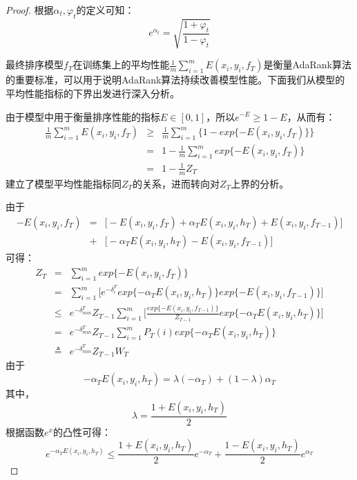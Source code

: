\begin{proof}
根据$\alpha_t,\varphi_t$的定义可知：
\begin{equation}
    e^{\alpha_t} = \sqrt{\frac{1+\varphi_t}{1-\varphi_t}}
\end{equation}

最终排序模型$f_T$在训练集上的平均性能$\frac{1}{m} \sum\limits_{i=1}^m E(x_i, y_i, f_T)$是衡量AdaRank算法的重要标准，可以用于说明AdaRank算法持续改善模型性能。下面我们从模型的平均性能指标的下界出发进行深入分析。

由于模型中用于衡量排序性能的指标$E\in [0,1]$，所以$e^{-E} \ge 1-E$，从而有：
\begin{equation}
    \begin{array}{lll}
      \frac{1}{m} \sum\limits_{i=1}^m E(x_i, y_i, f_T) & \ge & \frac{1}{m} \sum\limits_{i=1}^m \bigg\{ 1 - exp\{-E(x_i, y_i, f_T)\} \bigg\} \\
       & = & 1 - \frac{1}{m} \sum\limits_{i=1}^m exp\{-E(x_i, y_i, f_T)\} \\
       & = & 1 - \frac{1}{m} Z_T
    \end{array}
\end{equation}
建立了模型平均性能指标同$Z_T$的关系，进而转向对$Z_T$上界的分析。

由于
\[
    \begin{array}{lll}
      -E(x_i, y_i, f_T) & = & \big[-E(x_i, y_i, f_T) + \alpha_T E(x_i, y_i, h_T) + E(x_i, y_i, f_{T-1})\big] \\
       & + & \big[-\alpha_T E(x_i, y_i, h_T) - E(x_i, y_i, f_{T-1}) \big]
    \end{array}
\]
可得：
\begin{equation}
    \begin{array}{lll}
      Z_T & = & \sum\limits_{i=1}^m exp\{-E(x_i, y_i, f_T)\} \\
       & = & \sum\limits_{i=1}^m \bigg[e^{-\delta_i^T} exp\{-\alpha_T E(x_i, y_i, h_T)\} exp\{-E(x_i, y_i, f_{T-1})\}\bigg] \\
       & \le & e^{-\delta_{min}^T} Z_{T-1} \sum\limits_{i=1}^m \bigg[\frac{exp\{-E(x_i, y_i, f_{T-1})\}}{Z_{T-1}} exp\{-\alpha_T E(x_i, y_i, h_T)\}\bigg] \\
       & = & e^{-\delta_{min}^T} Z_{T-1} \sum\limits_{i=1}^m P_T(i) exp\{-\alpha_T E(x_i, y_i, h_T)\} \\
       & \triangleq & e^{-\delta_{min}^T} Z_{T-1}  W_T
    \end{array}
\end{equation}
由于
\[
    -\alpha_T E(x_i, y_i, h_T) = \lambda (-\alpha_T) + (1-\lambda) \alpha_T
\]
其中，
\[
    \lambda = \frac{1+E(x_i,y_i,h_T)}{2}
\]
根据函数$e^x$的凸性可得：
\begin{equation}
    e^{-\alpha_T E(x_i, y_i, h_T)} \le \frac{1+E(x_i,y_i,h_T)}{2} e^{-\alpha_T} + \frac{1-E(x_i,y_i,h_T)}{2} e^{\alpha_T}
\end{equation}


\end{proof}
